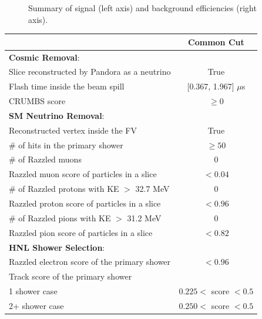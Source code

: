 \begin{figure}[htbp!]
    \caption{
		Summary of signal (left axis) and background efficiencies (right axis).
	}
        \label{fig:eff}
\end{figure}

\begin{table}[htbp!]
\centering
\begin{center}
\begin{tabular}{| p{7.75cm} | m{3.25cm} | m{3.25cm} |} 
 \hline
  & \multicolumn{2}{c|}{\textbf{Common Cut}} \\ [1ex] 
 \hline
 \textbf{Cosmic Removal}: & \multicolumn{2}{c|}{} \\ [1ex] 
 Slice reconstructed by Pandora as a neutrino & \multicolumn{2}{c|}{True} \\ 
 Flash time inside the beam spill & \multicolumn{2}{c|}{[0.367, 1.967] $\mu$s} \\ 
 CRUMBS score  & \multicolumn{2}{c|}{$\geq 0$} \\ [1ex] 
 \hline
 \textbf{SM Neutrino Removal}: & \multicolumn{2}{c|}{} \\ [1ex] 
 Reconstructed vertex inside the FV & \multicolumn{2}{c|}{True} \\
 \# of hits in the primary shower & \multicolumn{2}{c|}{$\geq 50$} \\ [1ex]
 \# of Razzled muons & \multicolumn{2}{c|}{0} \\
 Razzled muon score of particles in a slice & \multicolumn{2}{c|}{$< 0.04$} \\ [1ex]
 \# of Razzled protons with KE $>$ 32.7 MeV & \multicolumn{2}{c|}{0} \\
 Razzled proton score of particles in a slice & \multicolumn{2}{c|}{$< 0.96$} \\ [1ex]
 \# of Razzled pions with KE $>$ 31.2 MeV & \multicolumn{2}{c|}{0} \\
 Razzled pion score of particles in a slice & \multicolumn{2}{c|}{$< 0.82$} \\ [1ex]
 \hline
 \textbf{HNL Shower Selection}: & \multicolumn{2}{c|}{} \\ [1ex] 
 Razzled electron score of the primary shower & \multicolumn{2}{c|}{$< 0.96$} \\ [1ex]
 Track score of the primary shower & \multicolumn{2}{c|}{} \\
 \hspace{0.5cm}1 shower case & \multicolumn{2}{c|}{$0.225 <$ score $< 0.5$} \\
 \hspace{0.5cm}2+ shower case & \multicolumn{2}{c|}{$0.250 <$ score $< 0.5$} \\

\end{tabular}
\end{center}
\end{table}
